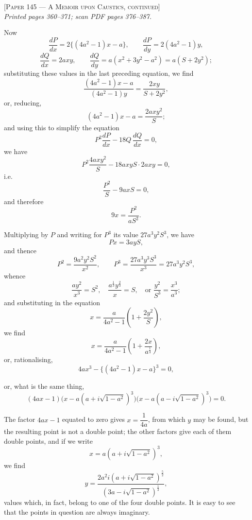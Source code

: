 \documentclass[11pt]{article}
\begin{document}
\begin{center}\textsc{[Paper 145 --- A Memoir upon Caustics, continued]}\\[4pt]
\textit{Printed pages 360--371; scan PDF pages 376--387.}\end{center}

\bigskip

\noindent Now
\[
\frac{dP}{dx} = 2\{(4a^2-1)x - a\}, \qquad \frac{dP}{dy} = 2(4a^2-1)y,
\]
\[
\frac{dQ}{dx} = 2axy, \qquad \frac{dQ}{dy} = a(x^2 + 3y^2 - a^2) = a(S + 2y^2);
\]
substituting these values in the last preceding equation, we find
\[
\frac{(4a^2-1)x - a}{(4a^2-1)y} = \frac{2xy}{S + 2y^2},
\]
or, reducing,
\[
(4a^2-1)x - a = \frac{2axy^2}{S};
\]
and using this to simplify the equation
\[
P^2 \frac{dP}{dx} - 18Q\,\frac{dQ}{dx} = 0,
\]
we have
\[
P^2 \frac{4axy^2}{S} - 18 axy S \cdot 2axy = 0,
\]
i.e.\
\[
\frac{P^2}{S} - 9axS = 0,
\]
and therefore
\[
9x = \frac{P^2}{aS^2}.
\]

\smallskip

Multiplying by $P$ and writing for $P^3$ its value $27a^3y^2S^3$, we have
\[
Px = 3ayS,
\]
and thence
\[
P^2 = \frac{9a^2y^2 S^2}{x^2}, \qquad P^3 = \frac{27a^3y^3 S^3}{x^3} = 27a^3 y^2 S^3,
\]
whence
\[
\frac{ay^2}{x^3} = S^2, \quad \frac{a^{\frac{1}{3}}y^{\frac{2}{3}}}{x} = S, \quad \text{or } \frac{y^2}{S^3} = \frac{x^3}{a^3};
\]
and substituting in the equation
\[
x = \frac{a}{4a^2-1}\!\left(1 + \frac{2y^2}{S}\right),
\]
we find
\[
x = \frac{a}{4a^2-1}\!\left(1 + \frac{2x}{a^{\frac{1}{3}}}\right),
\]
or, rationalising,
\[
4ax^3 - \{(4a^2-1)x - a\}^3 = 0,
\]

\newpage

\noindent or, what is the same thing,
\[
(4ax-1)\bigl(x - a(a + i\sqrt{1-a^2})^3\bigr)\bigl(x - a(a - i\sqrt{1-a^2})^3\bigr) = 0.
\]

The factor $4ax - 1$ equated to zero gives $x = \dfrac{1}{4a}$, from which $y$ may be found, but the resulting point is not a double point; the other factors give each of them double points, and if we write
\[
x = a(a + i\sqrt{1-a^2})^3,
\]
we find
\[
y = \frac{2a^2 i (a + i\sqrt{1-a^2})^{\frac{5}{2}}}{(3a - i\sqrt{1-a^2})^{\frac{1}{2}}},
\]
values which, in fact, belong to one of the four double points. It is easy to see that the points in question are always imaginary.
\end{document}
